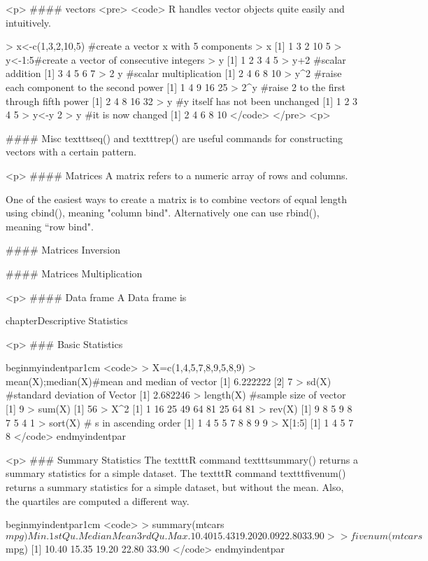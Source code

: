 <p>
#### {vectors}
<pre>
<code>
R handles vector objects quite easily and intuitively.

> x<-c(1,3,2,10,5)    #create a vector x with 5 components
> x
[1]  1  3  2 10  5
> y<-1:5#create a vector of consecutive integers
> y
[1] 1 2 3 4 5
> y+2   #scalar addition
[1] 3 4 5 6 7
> 2     y   #scalar multiplication
[1]  2  4  6  8 10
> y^2   #raise each component to the second power
[1]  1  4  9 16 25
> 2^y   #raise 2 to the first through fifth power
[1]  2  4  8 16 32
> y     #y itself has not been unchanged
[1] 1 2 3 4 5
> y<-y     2
> y     #it is now changed
[1]  2  4  6  8 10
</code>
</pre>
<p>


#### {Misc}
texttt{seq()} and texttt{rep()} are useful commands for constructing vectors with a certain pattern.


<p>
#### {Matrices}
A matrix refers to a numeric array of rows and columns.

One of the easiest ways to create a matrix is to combine vectors of equal
length using cbind(), meaning "column bind". Alternatively one can use rbind(), meaning ``row bind".



#### {Matrices Inversion}

#### {Matrices Multiplication}


<p>
#### {Data frame}
A Data frame is



chapter{Descriptive Statistics}

<p>
### {Basic Statistics}


begin{myindentpar}{1cm}
<code>
> X=c(1,4,5,7,8,9,5,8,9)
> mean(X);median(X)#mean and median of vector
[1] 6.222222
[2] 7
> sd(X)     #standard deviation of Vector
[1] 2.682246
> length(X) #sample size of vector
[1] 9
> sum(X)
[1] 56
> X^2
[1]  1 16 25 49 64 81 25 64 81
> rev(X)
[1] 9 8 5 9 8 7 5 4 1
> sort(X)   #      s in ascending order
[1] 1 4 5 5 7 8 8 9 9
> X[1:5]
[1] 1 4 5 7 8
</code>
end{myindentpar}



<p>
### {Summary Statistics}
The texttt{R} command texttt{summary()} returns a summary statistics for a simple dataset.
The texttt{R} command texttt{fivenum()} returns a summary statistics for a simple dataset, but without the mean.
Also, the quartiles are computed a different way.


begin{myindentpar}{1cm}
<code>
> summary(mtcars$mpg)
   Min. 1st Qu.  Median    Mean 3rd Qu.    Max.
  10.40   15.43   19.20   20.09   22.80   33.90 
>
> fivenum(mtcars$mpg)
[1] 10.40 15.35 19.20 22.80 33.90
</code>
end{myindentpar}





